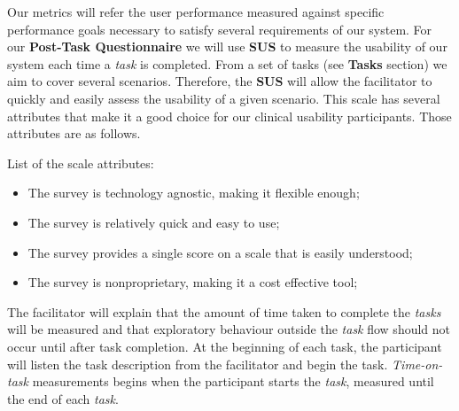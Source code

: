 Our metrics will refer the user performance measured against specific performance goals necessary to satisfy several requirements of our system. For our \textbf{Post-Task Questionnaire} we will use \textbf{SUS} to measure the usability of our system each time a \textit{task} is completed. From a set of tasks (see \textbf{Tasks} section) we aim to cover several scenarios. Therefore, the \textbf{SUS} will allow the facilitator to quickly and easily assess the usability of a given scenario. This scale has several attributes \cite{bangor2008empirical} that make it a good choice for our clinical usability participants. Those attributes are as follows.

\hfill


List of the scale attributes:


\hfill

\begin{itemize}
  \item The survey is technology agnostic, making it flexible enough;
  \item The survey is relatively quick and easy to use;
  \item The survey provides a single score on a scale that is easily understood;
  \item The survey is nonproprietary, making it a cost effective tool;
\end{itemize}

\hfill


The facilitator will explain that the amount of time taken to complete the \textit{tasks} will be measured and that exploratory behaviour outside the \textit{task} flow should not occur until after task completion. At the beginning of each task, the participant will listen the task description from the facilitator and begin the task. \textit{Time-on-task} measurements begins when the participant starts the \textit{task}, measured until the end of each \textit{task}.



